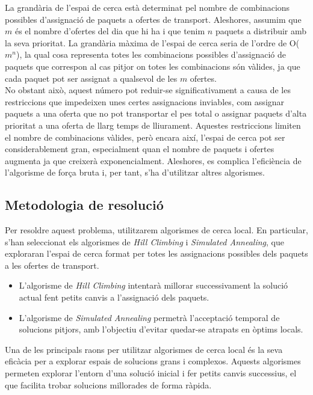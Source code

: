 \documentclass[a4paper]{article}
\begin{document}
	La grandària de l'espai de cerca està determinat pel nombre de combinacions possibles d'assignació de paquets a ofertes de transport. Aleshores, assumim que $m$ és el nombre d'ofertes del dia que hi ha i que tenim $n$ paquets a distribuir amb la seva prioritat. La grandària màxima de l'espai de cerca seria de l'ordre de O($m^n$), la qual cosa representa totes les combinacions possibles d'assignació de paquets que correspon al cas pitjor on totes les combinacions són vàlides, ja que cada paquet pot ser assignat a qualsevol de les $m$ ofertes. \\

	No obstant això, aquest número pot reduir-se significativament a causa de les restriccions que impedeixen unes certes assignacions inviables, com assignar paquets a una oferta que no pot transportar el pes total o assignar paquets d'alta prioritat a una oferta de llarg temps de lliurament. Aquestes restriccions limiten el nombre de combinacions vàlides, però encara així, l'espai de cerca pot ser considerablement gran, especialment quan el nombre de paquets i ofertes augmenta ja que creixerà  exponencialment. Aleshores, es complica l'eficiència de l'algorisme de força bruta i, per tant, s'ha d'utilitzar altres algorismes. \\

	\subsection{Metodologia de resolució}
	
	Per resoldre aquest problema, utilitzarem algorismes de cerca local. En particular, s'han seleccionat els algorismes de \textit{Hill Climbing} i \textit{Simulated Annealing}, que exploraran l'espai de cerca format per totes les assignacions possibles dels paquets a les ofertes de transport.
	
	\begin{itemize}
		\item L'algorisme de \textit{Hill Climbing} intentarà millorar successivament la solució actual fent petits canvis a l'assignació dels paquets.
		\item L'algorisme de \textit{Simulated Annealing} permetrà l'acceptació temporal de solucions pitjors, amb l'objectiu d'evitar quedar-se atrapats en òptims locals.
	\end{itemize}
	
	Una de les principals raons per utilitzar algorismes de cerca local és la seva eficàcia per a explorar espais de solucions grans i complexos. Aquests algorismes permeten explorar l'entorn d'una solució inicial i fer petits canvis successius, el que facilita trobar solucions millorades de forma ràpida. \\
	
\end{document}
